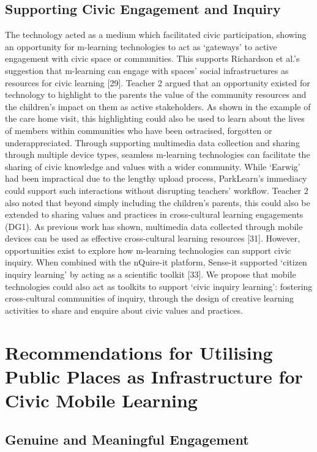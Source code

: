 \subsection{Supporting Civic Engagement and Inquiry}

The technology acted as a medium which facilitated civic participation, showing
an opportunity for m-learning technologies to act as ‘gateways’ to active
engagement with civic space or communities. This supports Richardson et al.’s
suggestion that m-learning can engage with spaces’ social infrastructures as
resources for civic learning [29]. Teacher 2 argued that an opportunity existed
for technology to highlight to the parents the value of the community resources
and the children’s impact on them as active stakeholders. As shown in the
example of the care home visit, this highlighting could also be used to learn
about the lives of members within communities who have been ostracised,
forgotten or underappreciated. Through supporting multimedia data collection and
sharing through multiple device types, seamless m-learning technologies can
facilitate the sharing of civic knowledge and values with a wider community.
While ‘Earwig’ had been impractical due to the lengthy upload process,
ParkLearn’s immediacy could support such interactions without disrupting
teachers’ workflow. Teacher 2 also noted that beyond simply including the
children’s parents, this could also be extended to sharing values and practices
in cross-cultural learning engagements (DG1). As previous work has shown,
multimedia data collected through mobile devices can be used as effective
cross-cultural learning resources [31]. However, opportunities exist to explore
how m-learning technologies can support civic inquiry. When combined with the
nQuire-it platform, Sense-it supported ‘citizen inquiry learning’ by acting as a
scientific toolkit [33]. We propose that mobile technologies could also act as
toolkits to support ‘civic inquiry learning’: fostering cross-cultural
communities of inquiry, through the design of creative learning activities to
share and enquire about civic values and practices.

\section{Recommendations for Utilising Public Places as Infrastructure for Civic Mobile Learning}

\subsection{Genuine and Meaningful Engagement}
